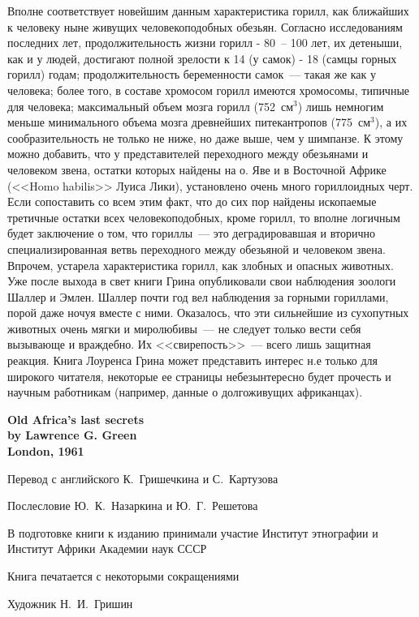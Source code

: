 \documentclass[12pt,a4paper,twoside,openany,svgnames]{memoir}
\begin{document}
Вполне соответствует новейшим данным характеристика горилл, как ближайших к человеку ныне живущих человекоподобных обезьян. Согласно исследованиям последних лет, продолжительность жизни горилл - 80~-- 100 лет, их детеныши, как и у людей, достигают полной зрелости к 14 (у самок) - 18 (самцы горных горилл) годам; продолжительность беременности самок~--- такая же как у человека; более того, в составе хромосом горилл имеются хромосомы, типичные для человека; максимальный объем мозга горилл (752~см$^3$) лишь немногим меньше минимального объема мозга древнейших питекантропов (775~см$^3$), а их сообразительность не только не ниже, но даже выше, чем у шимпанзе. К этому можно добавить, что у представителей переходного между обезьянами и человеком звена, остатки которых найдены на о. Яве и в Восточной Африке (<<Homo habilis>> Луиса Лики), установлено очень много гориллоидных черт. Если сопоставить со всем этим факт, что до сих пор найдены ископаемые третичные остатки всех человекоподобных, кроме горилл, то вполне логичным будет заключение о том, что гориллы~--- это деградировавшая и вторично специализированная ветвь переходного между обезьяной и человеком звена. Впрочем, устарела характеристика горилл, как злобных и опасных животных. Уже после выхода в свет книги Грина опубликовали свои наблюдения зоологи Шаллер и Эмлен. Шаллер почти год вел наблюдения за горными гориллами, порой даже ночуя вместе с ними. Оказалось, что эти сильнейшие из сухопутных животных очень мягки и миролюбивы~--- не следует только вести себя вызывающе и враждебно. Их <<свирепость>>~--- всего лишь защитная реакция. Книга Лоуренса Грина может представить интерес н.е только для широкого читателя, некоторые ее страницы небезынтересно будет прочесть и научным работникам (например, данные о долгоживущих африканцах).

\cleardoublepage
\vspace*{3cm}

\begin{center}
\noindent \textbf{Old Africa's last secrets\\
by Lawrence G. Green\\
London, 1961}

\vspace{2cm}

\noindent Перевод с английского К.~Гришечкина и С.~Картузова\vspace{0.5cm}

\noindent Послесловие Ю.~К.~Назаркина и Ю.~Г.~Решетова\vspace{0.5cm}

\noindent В подготовке книги к изданию принимали участие Институт этнографии и Институт Африки Академии наук СССР\vspace{0.3cm}

\noindent Книга печатается с некоторыми сокращениями\vspace{0.3cm}

\noindent Художник Н.~И.~Гришин\vspace{1cm}\end{center}
\end{document}
